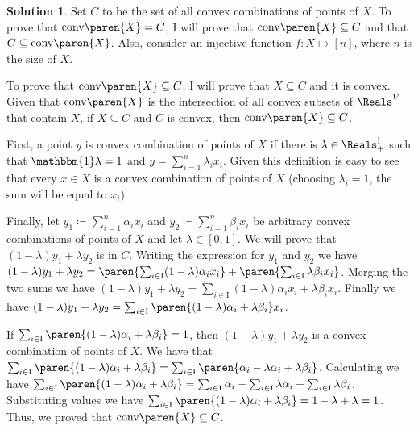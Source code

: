 \documentclass[11pt,leqno,final]{amsart}
\theoremstyle{definition}
\newtheorem{solution}{Solution}
\begin{document}
\begin{solution}
Set $C$ to be the set of all convex combinations of points of $X$. To prove that $\text{conv}\paren{X} = C$, I will prove that $\text{conv}\paren{X} \subseteq C$ and that $C \subseteq \text{conv}\paren{X}$. Also, consider an injective function $f:X \mapsto [n]$, where $n$ is the size of $X$. 

To prove that $\text{conv}\paren{X} \subseteq C$, I will prove that $X \subseteq C$ and it is convex. Given that $\text{conv}\paren{X}$ is the intersection of all convex subsets of $\Reals^{V}$ that contain $X$, if $X \subseteq C$ and $C$ is convex, then $\text{conv}\paren{X} \subseteq C$. 

First, a point $y$ is convex combination of points of $X$ if there is $\lambda\in \Reals_{+}^{\text{I}}$ such that $\mathbbm{1} \lambda = 1$ and $y = \sum_{i = 1}^{n} \lambda_{i}x_{i}$. Given this definition is easy to see that every $x \in X$ is a convex combination of points of $X$ (choosing $\lambda_{i} = 1$, the sum will be equal to $x_{i}$). 

Finally, let $y_1 \coloneqq \sum_{i = 1}^{n} \alpha_{i}x_{i}$ and $y_2 \coloneqq \sum_{i = 1}^{n} \beta_{i}x_{i}$ be arbitrary convex combinations of points of $X$ and let $\lambda \in [0,1]$. We will prove that $(1 - \lambda) y_{1} + \lambda y_{2}$ is in $C$. Writing the expression for $y_1$ and $y_2$ we have $ (1 - \lambda) y_{1} + \lambda y_{2} = \paren{\sum_{i \in \text{I}} (1 - \lambda)\alpha_{i}x_{i}} + \paren{\sum_{i \in \text{I}} \lambda\beta_{i}x_{i}} $. Merging the two sums we have $(1 - \lambda) y_{1} + \lambda y_{2} = \sum_{i \in \text{I}} (1 - \lambda)\alpha_{i}x_{i} +  \lambda\beta_{i}x_{i} $. Finally we have $(1 - \lambda) y_{1} + \lambda y_{2} = \sum_{i \in \text{I}} \paren{(1 - \lambda)\alpha_{i} +  \lambda\beta_{i}}x_{i} $.

If $\sum_{i \in \text{I}} \paren{(1 - \lambda)\alpha_{i} +  \lambda\beta_{i}} = 1$, then $(1 - \lambda) y_{1} + \lambda y_{2}$ is a convex combination of points of $X$. We have that $\sum_{i \in \text{I}} \paren{(1 - \lambda)\alpha_{i} +  \lambda\beta_{i}} = \sum_{i \in \text{I}} \paren{\alpha_{i} - \lambda\alpha_{i} +  \lambda\beta_{i}}$. Calculating we have $\sum_{i \in \text{I}} \paren{(1 - \lambda)\alpha_{i} +  \lambda\beta_{i}} = \sum_{i \in \text{I}} \alpha_{i} - \sum_{i \in \text{I}} \lambda\alpha_{i} +  \sum_{i \in \text{I}}\lambda\beta_{i}$. Substituting values we have $\sum_{i \in \text{I}} \paren{(1 - \lambda)\alpha_{i} +  \lambda\beta_{i}} = 1 - \lambda + \lambda = 1$. Thus, we proved that $\text{conv}\paren{X} \subseteq C$.


\end{solution}
\end{document}

